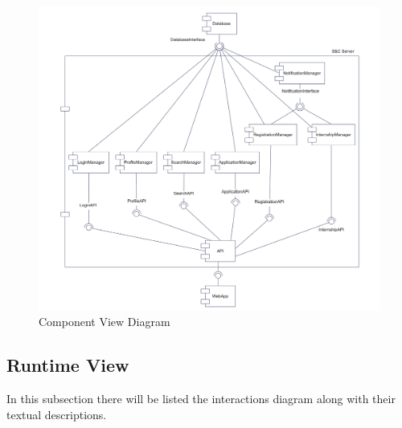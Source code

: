 \newpage
\begin{figure}[h!]
        \centering  \includegraphics[width=1\textwidth]{DD/Images/CD.png}
\caption*{Component View Diagram}
\label{fig:ComponentViewDiagram}
\end{figure}
\newpage

\newpage
\subsection{Runtime View}

In this subsection there will be listed the interactions diagram along with their textual descriptions.

